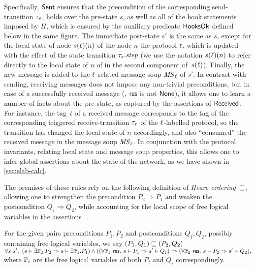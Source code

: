 Specifically, $\mathsf{Sent}$ ensures that the precondition of the
corresponding send-transition $\tau_s$, holds over the pre-state
$s$, as well as all of the hook statements imposed by $H$, which is
ensured by the auxiliary predicate $\mathsf{HooksOk}$ defined below in the
same figure. The immediate post-state $s'$ is the same as $s$, except
for the local state of node $s(\ell)(n)$ of the node $n$ \wrt the
protocol $\ell$, which is updated with the effect of the state
transition $\tau_s.\mathit{step}$ (we use the notation $s(\ell)(n)$ to
refer directly to the local state of $n$ of in the second component
of~$s(\ell)$). Finally, the new message is added to the $\ell$-related
message soup $\mathit{MS}_{\ell}$ of $s'$.
%
In contrast with sending, receiving messages does not impose any
non-trivial preconditions, but in case of a successfully received
message (\ie, $\mathsf{res}$ is not $\mathsf{None}$), it allows one to learn a number
of facts about the pre-state, as captured by the assertions of
$\mathsf{Received}$. For instance, the tag~$t$ of a received message
corresponds to the tag of the corresponding triggered
receive-transition $\tau_r$ of the $\ell$-labelled protocol, so the
transition has changed the local state of $n$ accordingly, and also
``consumed'' the received message in the message soup $\mathit{MS}_{\ell}$. In
conjunction with the protocol invariants, relating local state and
message soup properties, this allows one to infer global assertions
about the state of the network, as we have shown in
\cref{sec:elab-calc}.

The premises of these rules rely on the following definition of
\emph{Hoare ordering}~$\sqsubseteq$, allowing one to strengthen the
precondition $P_2 \Rightarrow P_1$ and weaken the postcondition
$Q_1 \Rightarrow Q_2$, while accounting for the local scope of free
logical variables in the assertions~\cite{Kleymann99}.
%
\begin{definition}
\label{def:hord}
For the given pairs preconditions $P_1,
P_2$ and postconditions $Q_1,
Q_2$, possibly containing free logical variables, we say $(P_1, Q_1)
\sqsubseteq (P_2, Q_2)$~\Iff~{\small$
\forall s~s',~(s \vDash \exists \overline{x}_2. P_2 \Rightarrow s \vDash
  \exists\overline{x}_1. P_1) \wedge
((\forall\overline{x}_1~\mathsf{res}.~s \vDash P_1 \Rightarrow s' \vDash Q_1)
  \Rightarrow
(\forall\overline{x}_2~\mathsf{res}.~s \vDash P_2 \Rightarrow s' \vDash Q_2),
$}
where $\overline{x}_i$ are the free logical variables of both $P_i$ and
$Q_i$ correspondingly.
\end{definition}


